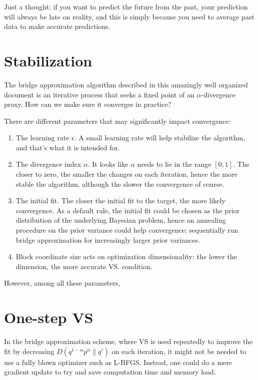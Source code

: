 \documentclass{article}
\begin{document}
Just a thought: if you want to predict the future from the past, your prediction will always be late on reality, and this is simply because you need to average past data to make accurate predictions.


\section{Stabilization}

The bridge approximation algorithm described in this amazingly well organized document is an iterative process that seeks a fixed point of an $\alpha$-divergence proxy. How can we make sure it converges in practice? 

There are different parameters that may significantly impact convergence:
\begin{enumerate}
\item The learning rate $\epsilon$. A small learning rate will help stabilize the algorithm, and that's what it is intended for. 
\item The divergence index $\alpha$. It looks like $\alpha$ needs to lie in the range $[0,1]$. The closer to zero, the smaller the changes on each iteration, hence the more stable the algorithm, although the slower the convergence of course.
\item The initial fit. The closer the initial fit to the target, the more likely convergence. As a default rule, the initial fit could be chosen as the prior distribution of the underlying Bayesian problem, hence an annealing procedure on the prior variance could help convergence: sequentially run bridge approximation for increasingly larger prior variances.
\item Block coordinate size acts on optimization dimensionality: the lower the dimension, the more accurate VS.  condition.
\end{enumerate}

However, among all these parameters, 


\section{One-step VS}

In the bridge approximation scheme, where VS is used repeatedly to improve the fit by decreasing $D(q^{1-\alpha}p^\alpha\|q')$ on each iteration, it might not be needed to use a fully blown optimizer such as L-BFGS. Instead, one could do a mere gradient update to try and save computation time and memory load. 
\end{document}
